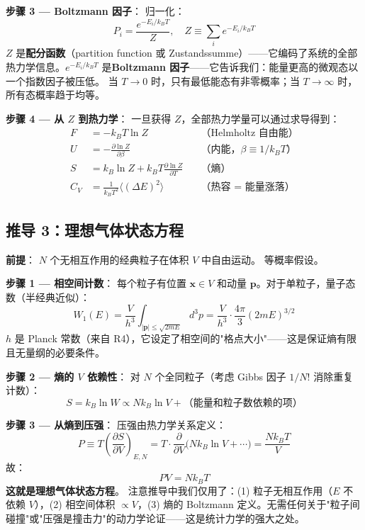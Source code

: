 \textbf{步骤 3 — Boltzmann 因子}：\fbox{[S]} 归一化：
\begin{equation}
\boxed{P_i = \frac{e^{-E_i/k_B T}}{Z}, \quad Z \equiv \sum_i e^{-E_i/k_B T}}
\end{equation}
\fbox{[S]} $Z$ 是\textbf{配分函数}（partition function 或 Zustandssumme）——它编码了系统的全部热力学信息。$e^{-E_i/k_B T}$ 是\textbf{Boltzmann 因子}——它告诉我们：能量更高的微观态以一个指数因子被压低。\fbox{[N]} 当 $T \to 0$ 时，只有最低能态有非零概率；当 $T \to \infty$ 时，所有态概率趋于均等。

\textbf{步骤 4 — 从 $Z$ 到热力学}：\fbox{[S]} 一旦获得 $Z$，全部热力学量可以通过求导得到：
\begin{align}
F &= -k_B T \ln Z \quad &\text{（Helmholtz 自由能）} \\
U &= -\frac{\partial \ln Z}{\partial\beta} \quad &\text{（内能，$\beta \equiv 1/k_B T$）} \\
S &= k_B \ln Z + k_B T\frac{\partial \ln Z}{\partial T} \quad &\text{（熵）} \\
C_V &= \frac{1}{k_B T^2}\langle(\Delta E)^2\rangle \quad &\text{（热容 = 能量涨落）}
\end{align}

\subsection{推导 3：理想气体状态方程}

\textbf{前提}：\fbox{[N]} $N$ 个无相互作用的经典粒子在体积 $V$ 中自由运动。\fbox{[N]} 等概率假设。

\textbf{步骤 1 — 相空间计数}：\fbox{[S]} 每个粒子有位置 $\mathbf{x} \in V$ 和动量 $\mathbf{p}$。对于单粒子，量子态数（半经典近似）：
\begin{equation}
W_1(E) = \frac{V}{h^3}\int_{|\mathbf{p}| \le \sqrt{2mE}} d^3p
= \frac{V}{h^3} \cdot \frac{4\pi}{3}(2mE)^{3/2}
\end{equation}
\fbox{[N]} $h$ 是 Planck 常数（来自 R4），它设定了相空间的"格点大小"——这是保证熵有限且无量纲的必要条件。

\textbf{步骤 2 — 熵的 $V$ 依赖性}：\fbox{[S]} 对 $N$ 个全同粒子（考虑 Gibbs 因子 $1/N!$ 消除重复计数）：
\begin{equation}
S = k_B\ln W \propto Nk_B\ln V + \text{（能量和粒子数依赖的项）}
\end{equation}

\textbf{步骤 3 — 从熵到压强}：\fbox{[S]} 压强由热力学关系定义：
\begin{equation}
P \equiv T\left(\frac{\partial S}{\partial V}\right)_{E,N}
= T \cdot \frac{\partial}{\partial V}\big(Nk_B\ln V + \cdots\big)
= \frac{Nk_B T}{V}
\end{equation}
\fbox{[S]} 故：
\begin{equation}
\boxed{PV = Nk_B T}
\end{equation}
\textbf{这就是理想气体状态方程}。\fbox{[N]} 注意推导中我们仅用了：(1) 粒子无相互作用（$E$ 不依赖 $V$），(2) 相空间体积 $\propto V$，(3) 熵的 Boltzmann 定义。无需任何关于"粒子间碰撞"或"压强是撞击力"的动力学论证——这是统计力学的强大之处。

